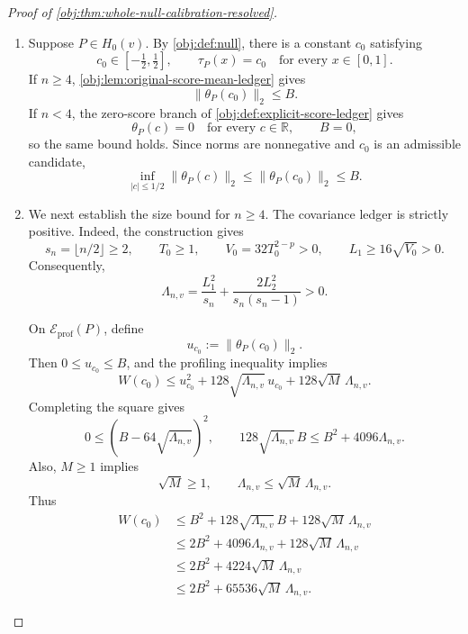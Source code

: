 \documentclass[11pt]{article}
\begin{document}
\begin{proof}[Proof of \cref{obj:thm:whole-null-calibration-resolved}]
\begin{enumerate}
\item Suppose \(P\in H_0(v)\). By \cref{obj:def:null}, there is a constant \(c_0\) satisfying
\[
c_0\in[-\tfrac12,\tfrac12],
\qquad
\tau_P(x)=c_0\quad\text{for every }x\in[0,1].
\]
If \(n\ge4\), \cref{obj:lem:original-score-mean-ledger} gives
\[
\|\theta_P(c_0)\|_2\le B.
\]
If \(n<4\), the zero-score branch of \cref{obj:def:explicit-score-ledger} gives
\[
\theta_P(c)=0\quad\text{for every }c\in\mathbb R,
\qquad B=0,
\]
so the same bound holds. Since norms are nonnegative and \(c_0\) is an admissible candidate,
\[
\inf_{|c|\le1/2}\|\theta_P(c)\|_2
\le \|\theta_P(c_0)\|_2
\le B.
\]

\item We next establish the size bound for \(n\ge4\). The covariance ledger is strictly positive. Indeed, the construction gives
\[
s_n=\lfloor n/2\rfloor\ge2,
\qquad
T_0\ge1,
\qquad
V_0=32T_0^{2-p}>0,
\qquad
L_1\ge16\sqrt{V_0}>0.
\]
Consequently,
\[
\Lambda_{n,v}
=
\frac{L_1^2}{s_n}
+\frac{2L_2^2}{s_n(s_n-1)}
>0.
\]

On \(\mathcal E_{\mathrm{prof}}(P)\), define
\[
u_{c_0}:=\|\theta_P(c_0)\|_2.
\]
Then \(0\le u_{c_0}\le B\), and the profiling inequality implies
\[
W(c_0)
\le
u_{c_0}^2
+128\sqrt{\Lambda_{n,v}}\,u_{c_0}
+128\sqrt M\,\Lambda_{n,v}.
\]
Completing the square gives
\[
0\le\left(B-64\sqrt{\Lambda_{n,v}}\right)^2,
\qquad
128\sqrt{\Lambda_{n,v}}\,B
\le B^2+4096\Lambda_{n,v}.
\]
Also, \(M\ge1\) implies
\[
\sqrt M\ge1,
\qquad
\Lambda_{n,v}\le\sqrt M\,\Lambda_{n,v}.
\]
Thus
\[
\begin{aligned}
W(c_0)
&\le B^2+128\sqrt{\Lambda_{n,v}}\,B
       +128\sqrt M\,\Lambda_{n,v}\\
&\le2B^2+4096\Lambda_{n,v}
       +128\sqrt M\,\Lambda_{n,v}\\
&\le2B^2+4224\sqrt M\,\Lambda_{n,v}\\
&\le2B^2+65536\sqrt M\,\Lambda_{n,v}.
\end{aligned}
\]


\end{enumerate}
\end{proof}
\end{document}
